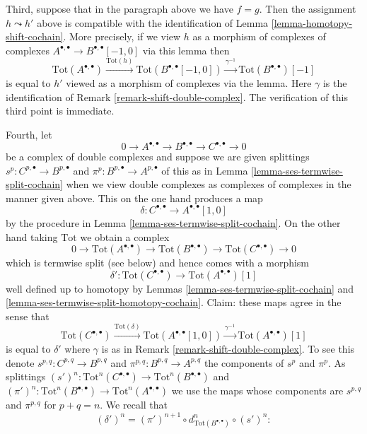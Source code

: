\begin{remark}
\medskip\noindent
Third, suppose that in the paragraph above we have $f = g$.
Then the assignment $h \leadsto h'$ above is compatible with
the identification of Lemma \ref{lemma-homotopy-shift-cochain}.
More precisely, if we view $h$ as a morphism of complexes
of complexes $A^{\bullet, \bullet} \to B^{\bullet, \bullet}[-1, 0]$
via this lemma then
$$
\text{Tot}(A^{\bullet, \bullet})
\xrightarrow{\text{Tot}(h)}
\text{Tot}(B^{\bullet, \bullet}[-1, 0])
\xrightarrow{\gamma^{-1}}
\text{Tot}(B^{\bullet, \bullet})[-1]
$$
is equal to $h'$ viewed as a morphism of complexes via the lemma.
Here $\gamma$ is the identification of
Remark \ref{remark-shift-double-complex}.
The verification of this third point is immediate.

\medskip\noindent
Fourth, let
$$
0 \to A^{\bullet, \bullet} \to B^{\bullet, \bullet} \to
C^{\bullet, \bullet} \to 0
$$
be a complex of double complexes and suppose we are given splittings
$s^p : C^{p, \bullet} \to B^{p, \bullet}$ and
$\pi^p : B^{p, \bullet} \to A^{p, \bullet}$
of this as in Lemma \ref{lemma-ses-termwise-split-cochain}
when we view double complexes
as complexes of complexes in the manner given above.
This on the one hand produces a map
$$
\delta : C^{\bullet, \bullet} \longrightarrow A^{\bullet, \bullet}[1, 0]
$$
by the procedure in Lemma \ref{lemma-ses-termwise-split-cochain}.
On the other hand taking $\text{Tot}$ we obtain a complex
$$
0 \to \text{Tot}(A^{\bullet, \bullet}) \to
\text{Tot}(B^{\bullet, \bullet}) \to
\text{Tot}(C^{\bullet, \bullet}) \to 0
$$
which is termwise split (see below) and hence comes with a morphism
$$
\delta' :
\text{Tot}(C^{\bullet, \bullet})
\longrightarrow
\text{Tot}(A^{\bullet, \bullet})[1]
$$
well defined up to homotopy by Lemmas \ref{lemma-ses-termwise-split-cochain}
and \ref{lemma-ses-termwise-split-homotopy-cochain}. Claim:
these maps agree in the sense that
$$
\text{Tot}(C^{\bullet, \bullet})
\xrightarrow{\text{Tot}(\delta)}
\text{Tot}(A^{\bullet, \bullet}[1, 0]) \xrightarrow{\gamma^{-1}}
\text{Tot}(A^{\bullet, \bullet})[1]
$$
is equal to $\delta'$ where $\gamma$ is as in
Remark \ref{remark-shift-double-complex}. To see this denote
$s^{p, q} : C^{p, q} \to B^{p, q}$ and
$\pi^{p, q} : B^{p, q} \to A^{p, q}$ the components of $s^p$ and $\pi^p$.
As splittings
$(s')^n : \text{Tot}^n(C^{\bullet, \bullet}) \to
\text{Tot}^n(B^{\bullet, \bullet})$
and
$(\pi')^n : \text{Tot}^n(B^{\bullet, \bullet}) \to
\text{Tot}^n(A^{\bullet, \bullet})$
we use the maps whose components are $s^{p, q}$ and $\pi^{p, q}$
for $p + q = n$. We recall that
$$
(\delta')^n =
(\pi')^{n + 1} \circ d_{\text{Tot}(B^{\bullet, \bullet})}^n \circ (s')^n :
$$
\end{remark}

